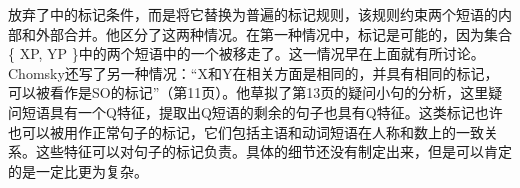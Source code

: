  \citet{Chomsky2013a}放弃了中的标记条件，而是将它替换为普遍的标记规则，该规则约束两个短语的内部和外部合并。他区分了这两种情况。在第一种情况中，标记是可能的，因为集合\{ XP, YP \}中的两个短语中的一个被移走了。这一情况早在上面就有所讨论。Chomsky还写了另一种情况：“X和Y在相关方面是相同的，并具有相同的标记，可以被看作是SO的标记”（第11页）。他草拟了第13页的疑问小句的分析，这里疑问短语具有一个Q特征，提取出Q短语的剩余的句子也具有Q特征。这类标记也许也可以被用作正常句子的标记，它们包括主语和动词短语在人称和数上的一致关系。这些特征可以对句子的标记负责。具体的细节还没有制定出来，但是可以肯定的是一定比更为复杂。

